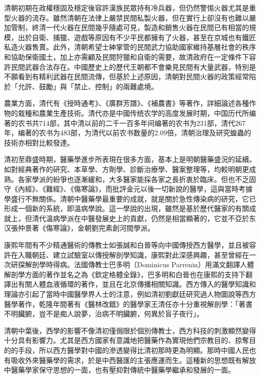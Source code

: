 清朝初期在政權穩固及穩定後容許漢族民眾持有冷兵器，但仍然警惕火器尤其是重型火器的流存。雖然清朝在法律上嚴禁民間私製火器，但在實行上卻沒有也難以嚴加管制，終清一代火器在民間幾乎隨處可見，製造和銷售火器在民間已有相當的規模，出於自衛、捕獵、遊戲等原因有不少平民都擁有了火器，甚至在京城也有鐵匠私造火器售賣。此外，清朝希望士紳掌管的民間武力協助國家維持基層社會的秩序和協助保衛國土，加上亦需顧及民間狩獵和自衛的需要，故清政府在一定條件下容許民間武器合法存在。中國歷史上的歷代王朝都不會樂見民間有大量武器，特別是不願看到有精利武器在民間流傳，但基於上述原因，清朝對民間火器的政策經常陷於「允許、鼓勵」與「禁止、控制」的兩難處境。

農業方面，清代有《授時通考》、《廣群芳譜》、《補農書》等著作，詳細論述各種作物的栽種和農業生產技術。清代亦是中國传统农学的高度发展时期，中国历代所编著的农书共714部，其中清以前的二千一百多年间编著的农书为231部，清代267年，编著的农书为483部，为清代以前农书数量的2.09倍，清朝治理及研究蝗蟲的技術亦相對比較發達。

清初至鼎盛時期，醫藥學進步所表現在很多方面，基本上是明朝醫藥盛況的延續。如對經典著作的研究、本草學、方劑學、診斷治療學、醫案整理等，均較明朝更成熟。各家學派的紛爭也逐漸緩和，大多醫家能採各家之長折衷於臨床。但也不乏固守《內經》、《難經》、《傷寒論》，而批評金元以後一切新說的醫學，這與當時考據學盛行不無關係。清朝中醫藥學最重要的成就，就是關於急性傳染病的研究，它已形成一個新的系統，即溫病學說。這一學說的出現，雖然是基於歷代醫家的有關成就上，但清代溫病學派在中醫發展史上的貢獻，仍然是相當顯著的，它並不亞於东汉張仲景著《傷寒論》，金朝劉完素創河間學派。

康熙年間有不少精通醫術的傳教士如張誠和白晉等向中國傳授西方醫學，並且被容許在入職朝廷、建立試驗室以傳授解剖學知識，康熙對此深感興趣，甚至曾經在一次研探解剖學時得病。法國傳教士巴多明（Dominicus Parrenin）用滿文翻譯人體解剖學方面的著作並名之為《欽定格體全錄》，巴多明和白晉也在康熙的支持下翻譯出有關人體血液循環的著作，並且在北京傳播相關知識。西方傳入的醫學知識和理論亦引起了當時中國醫學界人士的注意，例如清初劉獻廷研究過人物圖說等西方醫學著作，乾隆年間著有《醫林改錯》的醫學家王清任亦十分重視解剖學：「著書不明臟腑，豈不是痴人說夢，治病不明臟腑，何異於盲子夜行」。

清朝中葉後，西學的影響不像清初僅侷限於個別傳教士，西方科技的刺激顯然變得十分具有影響力。尤其是西方國家有意識地把醫藥作為實現他們宗教目的、掠奪目的的手段，所以西方醫學對中國的滲透變得比清初那時更為明顯。那時中國人民也有吸收外來醫藥學的需求，於是中西醫匯的主張應運而生。這種新的思想既有解放中醫藥學家保守思想的一面，也有壓抑對傳統中醫藥學繼承和發展的一面。

